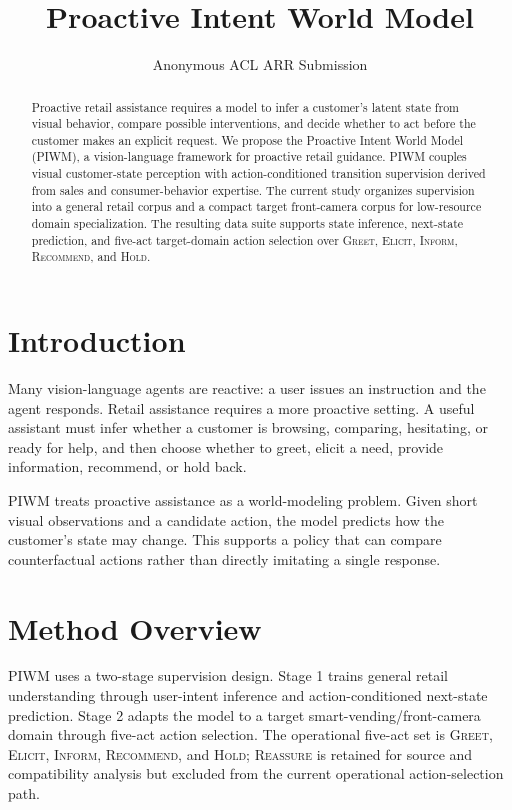 \documentclass[11pt]{article}
\title{Proactive Intent World Model}
\author{Anonymous ACL ARR Submission}
\date{}
\begin{document}
\maketitle

\begin{abstract}
Proactive retail assistance requires a model to infer a customer's latent state from visual behavior, compare possible interventions, and decide whether to act before the customer makes an explicit request. We propose the Proactive Intent World Model (PIWM), a vision-language framework for proactive retail guidance. PIWM couples visual customer-state perception with action-conditioned transition supervision derived from sales and consumer-behavior expertise. The current study organizes supervision into a general retail corpus and a compact target front-camera corpus for low-resource domain specialization. The resulting data suite supports state inference, next-state prediction, and five-act target-domain action selection over \textsc{Greet}, \textsc{Elicit}, \textsc{Inform}, \textsc{Recommend}, and \textsc{Hold}.
\end{abstract}

\section{Introduction}

Many vision-language agents are reactive: a user issues an instruction and the agent responds. Retail assistance requires a more proactive setting. A useful assistant must infer whether a customer is browsing, comparing, hesitating, or ready for help, and then choose whether to greet, elicit a need, provide information, recommend, or hold back.

PIWM treats proactive assistance as a world-modeling problem. Given short visual observations and a candidate action, the model predicts how the customer's state may change. This supports a policy that can compare counterfactual actions rather than directly imitating a single response.

\section{Method Overview}

PIWM uses a two-stage supervision design. Stage 1 trains general retail understanding through user-intent inference and action-conditioned next-state prediction. Stage 2 adapts the model to a target smart-vending/front-camera domain through five-act action selection. The operational five-act set is \textsc{Greet}, \textsc{Elicit}, \textsc{Inform}, \textsc{Recommend}, and \textsc{Hold}; \textsc{Reassure} is retained for source and compatibility analysis but excluded from the current operational action-selection path.
\end{document}
